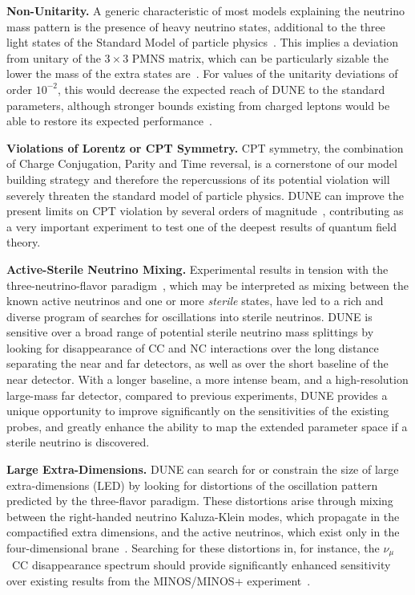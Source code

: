 {\bf Non-Unitarity.} 
A generic characteristic of most models explaining the neutrino mass
pattern is the presence of heavy neutrino states, additional to the
three light states of the Standard Model of particle
physics~\cite{Minkowski:1977sc,Mohapatra:1979ia,Yanagida:1979as,GellMann:1980vs}. This implies a deviation from unitary of the $3\times3$ PMNS matrix, which can be particularly sizable the lower the mass of the extra states are~\cite{Mohapatra:1986bd,Akhmedov:1995vm,Akhmedov:1995ip,Malinsky:2005bi}.
For values of the unitarity deviations of order $10^{-2}$, this would decrease the expected reach of DUNE to the standard parameters, although stronger bounds existing from charged leptons would be able to restore its expected performance~\cite{Blennow:2016jkn,Escrihuela:2016ube}.

{\bf Violations of Lorentz or CPT Symmetry.}
CPT symmetry, the combination of Charge Conjugation, Parity and Time reversal, is a cornerstone of our model building strategy and therefore the repercussions of its potential violation will severely threaten the standard model of particle physics. DUNE can improve the present limits on CPT violation by several orders of magnitude~\cite{Streater:1989vi,Barenboim:2002tz,Barenboim:2017ewj}, contributing
as a very important experiment to test one of the deepest results of quantum field theory.

{\bf Active-Sterile Neutrino Mixing.}
Experimental results in tension with the three-neutrino-flavor paradigm~\cite{LSNDSterile,MiniBooNESterile,GalliumSummary,ReactorSummary}, which may be interpreted as mixing between the known active neutrinos and one or more {\it sterile} states, have led to a rich and diverse program of searches for oscillations into sterile neutrinos.
DUNE is sensitive over a broad range of potential sterile neutrino mass splittings by looking for disappearance of CC and NC interactions over the long distance separating the near and far detectors, as well as over the short baseline of the near detector. 
With a longer baseline, a more intense beam, and a high-resolution large-mass far detector, compared to previous experiments, DUNE provides a unique opportunity to improve significantly on the sensitivities of the existing probes, and greatly enhance the ability to map the extended parameter space if a sterile neutrino is discovered.

{\bf Large Extra-Dimensions.}
DUNE can search for or constrain the size of large extra-dimensions (LED) by looking for distortions of the oscillation pattern predicted by the three-flavor paradigm. These distortions arise through mixing between the right-handed neutrino Kaluza-Klein modes, which propagate in the compactified extra dimensions, and the active neutrinos, which exist only in the four-dimensional brane~\cite{LEDModel}. Searching for these distortions in, for instance, the $\nu_\mu$~CC disappearance spectrum should provide significantly enhanced sensitivity over existing results from the MINOS/MINOS+ experiment~\cite{MinosplusLED}.


